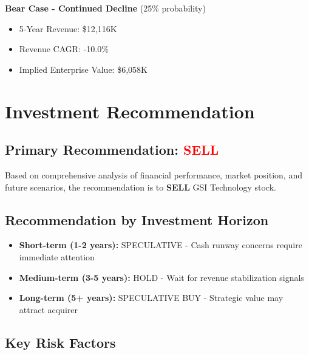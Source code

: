 \documentclass[11pt,a4paper]{article}
\begin{document}
\vspace{0.2cm}

\textbf{Bear Case - Continued Decline} (25\% probability)

\begin{itemize}
\itemsep0.2em
\item 5-Year Revenue: \$12,116K
\item Revenue CAGR: -10.0\%
\item Implied Enterprise Value: \$6,058K
\end{itemize}

\vspace{0.2cm}


\newpage

\section{Investment Recommendation}

\subsection{Primary Recommendation: \textcolor{red}{SELL}}

Based on comprehensive analysis of financial performance, market position, and future scenarios, the recommendation is to \textbf{SELL} GSI Technology stock.

\vspace{0.3cm}

\subsection{Recommendation by Investment Horizon}

\begin{itemize}
\itemsep0.3em
\item \textbf{Short-term (1-2 years):} SPECULATIVE - Cash runway concerns require immediate attention
\item \textbf{Medium-term (3-5 years):} HOLD - Wait for revenue stabilization signals
\item \textbf{Long-term (5+ years):} SPECULATIVE BUY - Strategic value may attract acquirer
\end{itemize}

\vspace{0.3cm}

\subsection{Key Risk Factors}
\end{document}

